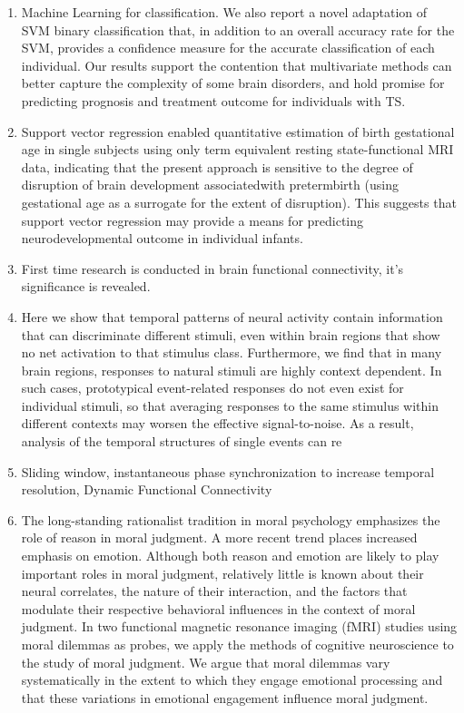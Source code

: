 \documentclass[12pt]{article}
\begin{document}
\begin{enumerate}
\item \cite{peterson12} Machine Learning for classification. We also report a novel adaptation of SVM binary classification that, in addition to an overall accuracy rate for the SVM, provides a confidence measure for the accurate classification of each individual. Our results support the contention that multivariate methods can better capture the complexity of some brain disorders, and hold promise for predicting prognosis and treatment outcome for individuals with TS.
\item \cite{peterson17} Support vector regression enabled quantitative estimation of birth gestational age in single subjects using only term equivalent resting state-functional MRI data, indicating that the present approach is sensitive to the degree of disruption of brain development associatedwith pretermbirth (using gestational age as a surrogate for the extent of disruption). This suggests that support vector regression may provide a means for predicting neurodevelopmental outcome in individual infants.
\item \cite{olaf2005} First time research is conducted in brain functional connectivity, it's significance is revealed.
\item \cite{hasson2012} Here we show that temporal patterns of neural activity contain information that can discriminate different stimuli, even within brain regions that show no net activation to that stimulus class. Furthermore, we find that in many brain regions, responses to natural stimuli are highly context dependent. In such cases, prototypical event-related responses do not even exist for individual stimuli, so that averaging responses to the same stimulus within different contexts may worsen the effective signal-to-noise. As a result, analysis of the temporal structures of single events can re
\item \cite{enrico2011} Sliding window, instantaneous phase synchronization to increase temporal resolution, Dynamic Functional Connectivity
\item \cite{Greene01} The long-standing rationalist tradition in moral psychology emphasizes the role of reason in moral judgment. A more recent trend places increased emphasis on emotion. Although both reason and emotion are likely to play important roles in moral judgment, relatively little is known about their neural correlates, the nature of their interaction, and the factors that modulate their respective behavioral influences in the context of moral judgment. In two functional magnetic resonance imaging (fMRI) studies using moral dilemmas as probes, we apply the methods of cognitive neuroscience to the study of moral judgment. We argue that moral dilemmas vary systematically in the extent to which they engage emotional processing and that these variations in emotional engagement influence moral judgment.

\end{enumerate}
\end{document}
